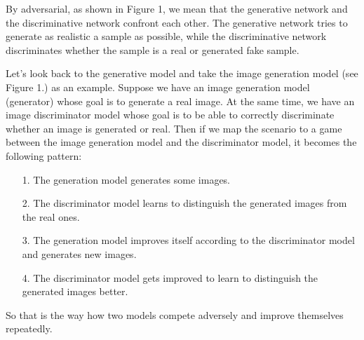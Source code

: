 \documentclass[10pt,twocolumn,letterpaper]{article}
\begin{document}
By adversarial, as shown in Figure 1, we mean that the generative network and the discriminative network confront each other. The generative network tries to generate as realistic a sample as possible, while the discriminative network discriminates whether the sample is a real or generated fake sample.

Let's look back to the generative model and take the image generation model (see Figure 1.) as an example. Suppose we have an image generation model (generator) whose goal is to generate a real image. At the same time, we have an image discriminator model whose goal is to be able to correctly discriminate whether an image is generated or real. Then if we map the scenario to a game between the image generation model and the discriminator model, it becomes the following pattern: 
\begin{itemize}
    \item[1.] The generation model generates some images.
    \item[2.] The discriminator model learns to distinguish the generated images from the real ones.
    \item[3.] The generation model improves itself according to the discriminator model and generates new images.
    \item[4.] The discriminator model gets improved to learn to distinguish the generated images better.
\end{itemize}
So that is the way how two models compete adversely and improve themselves repeatedly. 
\end{document}
